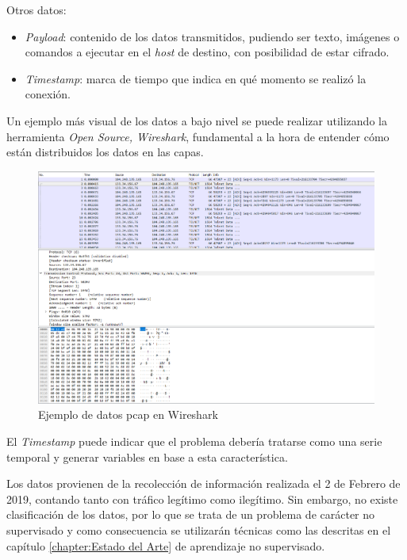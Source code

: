 Otros datos:

\begin{itemize}
    \item \textit{Payload}: contenido de los datos transmitidos, pudiendo ser texto, imágenes o comandos a ejecutar en el \textit{host} de destino, con posibilidad de estar cifrado.
    \item \textit{Timestamp}: marca de tiempo que indica en qué momento se realizó la conexión.
\end{itemize}

Un ejemplo más visual de los datos a bajo nivel se puede realizar utilizando la herramienta \textit{Open Source, Wireshark}, fundamental a la hora de entender cómo están distribuidos los datos en las capas.

\begin{figure}[H]
    \centering
    \includegraphics[width=15cm]{figs/wireshark.PNG}
    \caption{Ejemplo de datos pcap en Wireshark}
    \label{fig:wireshark}
\end{figure}

El \textit{Timestamp} puede indicar que el problema debería tratarse como una serie temporal y generar variables en base a esta característica.

Los datos provienen de la recolección de información realizada el 2 de Febrero de 2019, contando tanto con tráfico legítimo como ilegítimo. Sin embargo, no existe clasificación de los datos, por lo que se trata de un problema de carácter no supervisado y como consecuencia se utilizarán técnicas como las descritas en el capítulo \ref{chapter:Estado del Arte} de aprendizaje no supervisado.

\newpage

